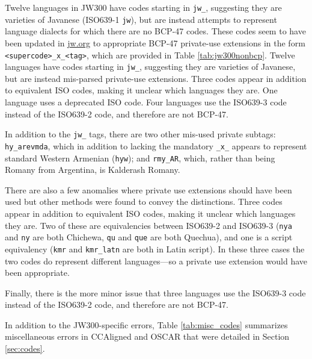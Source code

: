 Twelve languages in JW300 have codes starting in \texttt{jw\_}, suggesting they are varieties of Javanese (ISO639-1 \texttt{jw}), but are instead attempts to represent language dialects for which there are no BCP-47 codes. These codes seem to have been updated in \url{jw.org} to appropriate BCP-47 private-use extensions in the form \texttt{<supercode>\_x\_<tag>}, which are provided in Table \ref{tab:jw300nonbcp}.
Twelve languages have codes starting in \texttt{jw\_}, suggesting they are varieties of Javanese, but are instead mis-parsed private-use extensions. Three codes appear in addition to equivalent ISO codes, making it unclear which languages they are. One language uses a deprecated ISO code. Four languages use the ISO639-3 code instead of the ISO639-2 code, and therefore are not BCP-47.

In addition to the \texttt{jw\_} tags, there are two other mis-used private subtags: \texttt{hy\_arevmda}, which in addition to lacking the mandatory \texttt{\_x\_} appears to represent standard Western Armenian (\texttt{hyw}); and \texttt{rmy\_AR}, which, rather than being Romany from Argentina, is Kalderash Romany.

There are also a few anomalies where private use extensions should have been used but other methods were found to convey the distinctions. Three codes appear in addition to equivalent ISO codes, making it unclear which languages they are. Two of these are equivalencies between  ISO639-2 and  ISO639-3 (\texttt{nya} and \texttt{ny} are both Chichewa, \texttt{qu} and \texttt{que} are both Quechua), and one is a script equivalency (\texttt{kmr} and \texttt{kmr\_latn} are both in Latin script). In these three cases the two codes do represent different languages---so a private use extension would have been appropriate.

Finally, there is the more minor issue that three languages use the ISO639-3 code instead of the ISO639-2 code, and therefore are not BCP-47.


In addition to the JW300-specific errors, Table \ref{tab:misc_codes} summarizes miscellaneous errors in CCAligned and OSCAR that were detailed in Section \ref{sec:codes}.

